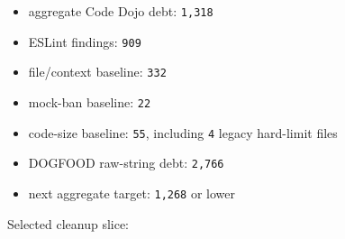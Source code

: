 \begin{itemize}
\tightlist
\item
  aggregate Code Dojo debt: \texttt{1\allowbreak{},\allowbreak{}3\allowbreak{}1\allowbreak{}8}
\item
  ESLint findings: \texttt{9\allowbreak{}0\allowbreak{}9}
\item
  file/context baseline: \texttt{3\allowbreak{}3\allowbreak{}2}
\item
  mock-ban baseline: \texttt{2\allowbreak{}2}
\item
  code-size baseline: \texttt{5\allowbreak{}5}, including \texttt{4} legacy hard-limit files
\item
  DOGFOOD raw-string debt: \texttt{2\allowbreak{},\allowbreak{}7\allowbreak{}6\allowbreak{}6}
\item
  next aggregate target: \texttt{1\allowbreak{},\allowbreak{}2\allowbreak{}6\allowbreak{}8} or lower
\end{itemize}

Selected cleanup slice:

